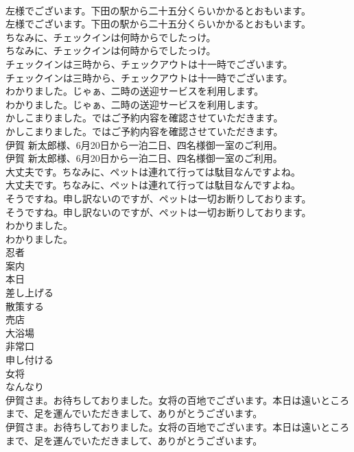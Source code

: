 \documentclass[8pt]{extreport}
\begin{document}
\begin{CJK}{UTF8}{min}
\\	左様でございます。下田の駅から二十五分くらいかかるとおもいます。	
\\	左様でございます。下田の駅から二十五分くらいかかるとおもいます。 
\\	ちなみに、チェックインは何時からでしたっけ。	
\\	ちなみに、チェックインは何時からでしたっけ。 
\\	チェックインは三時から、チェックアウトは十一時でございます。	
\\	チェックインは三時から、チェックアウトは十一時でございます。 
\\	わかりました。じゃぁ、二時の送迎サービスを利用します。	
\\	わかりました。じゃぁ、二時の送迎サービスを利用します。 
\\	かしこまりました。ではご予約内容を確認させていただきます。	
\\	かしこまりました。ではご予約内容を確認させていただきます。 
\\	伊賀 新太郎様、6月20日から一泊二日、四名様御一室のご利用。	
\\	伊賀 新太郎様、6月20日から一泊二日、四名様御一室のご利用。 
\\	大丈夫です。ちなみに、ペットは連れて行っては駄目なんですよね。	
\\	大丈夫です。ちなみに、ペットは連れて行っては駄目なんですよね。 
\\	そうですね。申し訳ないのですが、ペットは一切お断りしております。	
\\	そうですね。申し訳ないのですが、ペットは一切お断りしております。 
\\	わかりました。	
\\	わかりました。 
\\	忍者
\\	案内
\\	本日
\\	差し上げる
\\	散策する
\\	売店
\\	大浴場
\\	非常口
\\	申し付ける
\\	女将
\\	なんなり
\\	伊賀さま。お待ちしておりました。女将の百地でございます。本日は遠いところまで、足を運んでいただきまして、ありがとうございます。	
\\	伊賀さま。お待ちしておりました。女将の百地でございます。本日は遠いところまで、足を運んでいただきまして、ありがとうございます。 

\end{CJK}
\end{document}
